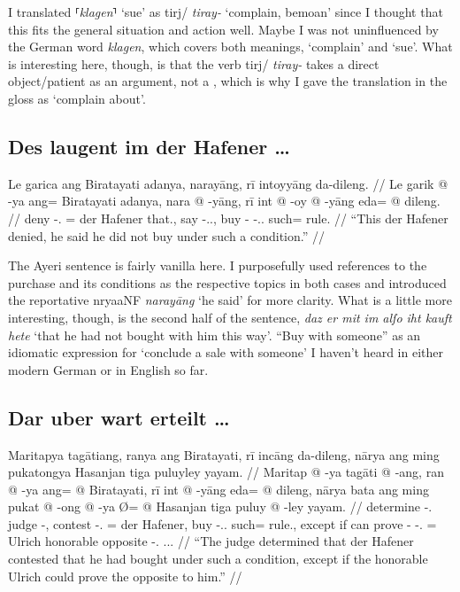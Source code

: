 \documentclass[12pt,paper=a4]{scrartcl}
\newcommand{\fw}[1]{\textit{#1}} %
\newcommand{\norm}[1]{⸢\textit{#1}⸣} %
\newcommand{\ayr}[1]{{\Tagati #1}}
\newcommand{\xayr}[3]{{\Tagati #1} \emph{#2} \enquote*{#3}}
\begin{document}
I translated \norm{klagen} `sue' as \xayr{tirj/}{tiray-}{complain, bemoan} 
since I thought that this fits the general situation and action well. Maybe I 
was not uninfluenced by the German word \Nhg{} \fw{klagen}, which covers both 
meanings, `complain' and `sue'. What is interesting here, though, is that the 
verb \ayr{tirj/} \fw{tiray-} takes a direct object/patient \Np{} as an argument, 
not a \Pp{}, which is why I gave the translation in the gloss as `complain 
about'.

\subsection*{Des laugent im der Hafener …}


\ex
\begingl
	\glpreamble Le garica ang Biratayati adanya, narayāng, rī intoyyāng 
		da-dileng. //
	\gla Le garik @ -ya ang= Biratayati adanya, nara @ -yāng, rī int @ 
		-oy @ -yāng eda= @ dileng. //
	\glb \PatT{} deny -\Tsg{}.\M{} \Aarg{}= {der Hafener} that.\Top{}, say 
		-\Tsg{}.\M{}.\Aarg{}, \InsT{} buy -\Neg{} -\Tsg{}.\M{}.\Aarg{} 
		such= rule.\Top{} //
	\glft \enquote{This der Hafener denied, he said he did not buy under 
		such a condition.} //
\endgl \xe

The Ayeri sentence is fairly vanilla here. I purposefully used references to 
the purchase and its conditions as the respective topics in both cases and 
introduced the reportative \xayr{nryaaNF}{narayāng}{he said} for more clarity. 
What is a little more interesting, though, is the second half of the \Mhg{} 
sentence, \fw{daz er mit im alſo iht kauft hete} `that he had not bought with 
him this way'. \enquote{Buy with someone} as an idiomatic expression for 
`conclude a sale with someone' I haven't heard in either modern German or in 
English so far.

\subsection*{Dar uber wart erteilt …}


\ex \begingl
	\glpreamble Maritapya tagātiang, ranya ang Biratayati, rī incāng
		da-dileng, nārya ang ming pukatongya Hasanjan tiga puluyley 
		yayam. //
	\gla Maritap @ -ya tagāti @ -ang, ran @ -ya ang= @ Biratayati, rī
		int @ -yāng eda= @ dileng, nārya bata ang ming pukat @ -ong @ 
		-ya Ø= @ Hasanjan tiga puluy @ -ley yayam. //
	\glb determine -\Tsg{}.\M{} judge -\Aarg{}, contest -\Tsg{}.\M{}
		\Aarg{}= {der Hafener}, \InsT{} buy -\Tsg{}.\M{}.\Aarg{} such= 
		rule.\Top{}, except if \AgtT{} can prove -\Irr{} -\Tsg{}.\M{} 
		\Top{}= Ulrich honorable opposite -\Parg{}.\Inan{} 
		\Tsg{}.\M{}.\Dat{}. //
	\glft \enquote{The judge determined that der Hafener contested that 
		he had bought under such a condition, except if the honorable 
		Ulrich could prove the opposite to him.} //
\endgl \xe
\end{document}
